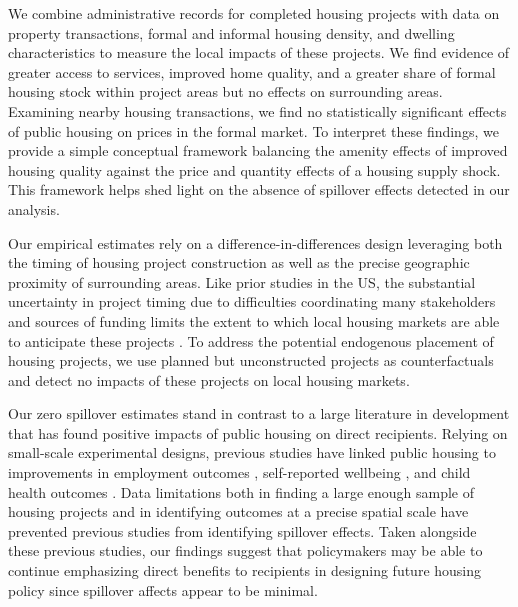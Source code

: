 \documentclass[12pt]{article}
\begin{document}
We combine administrative records for completed housing projects with data on property transactions, formal and informal housing density, and dwelling characteristics to measure the local impacts of these projects.   We find evidence of greater access to services, improved home quality, and a greater share of formal housing stock within project areas but no effects on surrounding areas.  Examining nearby housing transactions, we find no statistically significant effects of public housing on prices in the formal market.  To interpret these findings, we provide a simple conceptual framework balancing the amenity effects of improved housing quality against the price and quantity effects of a housing supply shock.  This framework helps shed light on the absence of spillover effects detected in our analysis.


Our empirical estimates rely on a difference-in-differences design leveraging both the timing of housing project construction as well as the precise geographic proximity of surrounding areas. Like prior studies in the US, the substantial uncertainty in project timing due to difficulties coordinating many stakeholders and sources of funding limits the extent to which local housing markets are able to anticipate these projects \citep{diamond2016wants, serihistory}.  To address the potential endogenous placement of housing projects, we use planned but unconstructed projects as counterfactuals and detect no impacts of these projects on local housing markets.

Our zero spillover estimates stand in contrast to a large literature in development that has found positive impacts of public housing on direct recipients.  Relying on small-scale experimental designs, previous studies have linked public housing to improvements in employment outcomes \citep{franklin2016enabled}, self-reported wellbeing \citep{galiani2017shelter, devoto2012happiness}, and child health outcomes \citep{cattaneo2009housing}.  Data limitations both in finding a large enough sample of housing projects and in identifying outcomes at a precise spatial scale have prevented previous studies from identifying spillover effects.  Taken alongside these previous studies, our findings suggest that policymakers may be able to continue emphasizing direct benefits to recipients in designing future housing policy since spillover affects appear to be minimal.
\end{document}
